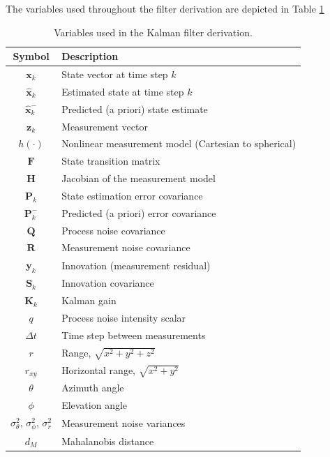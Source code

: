 The variables used throughout the filter derivation are depicted in Table \ref{tab:EKF_variables}
\begin{table}[h]
\centering
\caption{Variables used in the Kalman filter derivation.}
\begin{tabular}{cl}
\hline
\textbf{Symbol} & \textbf{Description} \\
\hline
$\mathbf{x}_k$ & State vector at time step $k$ \\
$\hat{\mathbf{x}}_k$ & Estimated state at time step $k$ \\
$\hat{\mathbf{x}}_k^-$ & Predicted (a priori) state estimate \\
$\mathbf{z}_k$ & Measurement vector \\
$h(\cdot)$ & Nonlinear measurement model (Cartesian to spherical) \\
$\mathbf{F}$ & State transition matrix \\
$\mathbf{H}$ & Jacobian of the measurement model \\
$\mathbf{P}_k$ & State estimation error covariance \\
$\mathbf{P}_k^-$ & Predicted (a priori) error covariance \\
$\mathbf{Q}$ & Process noise covariance \\
$\mathbf{R}$ & Measurement noise covariance \\
$\mathbf{y}_k$ & Innovation (measurement residual) \\
$\mathbf{S}_k$ & Innovation covariance \\
$\mathbf{K}_k$ & Kalman gain \\
$q$ & Process noise intensity scalar \\
$\Delta t$ & Time step between measurements \\
$r$ & Range, $\sqrt{x^2 + y^2 + z^2}$ \\
$r_{xy}$ & Horizontal range, $\sqrt{x^2 + y^2}$ \\
$\theta$ & Azimuth angle \\
$\phi$ & Elevation angle \\
$\sigma_\theta^2,\, \sigma_\phi^2,\, \sigma_r^2$ & Measurement noise variances \\
$d_M$ & Mahalanobis distance \\
\hline
\end{tabular}
\label{tab:EKF_variables}
\end{table}

